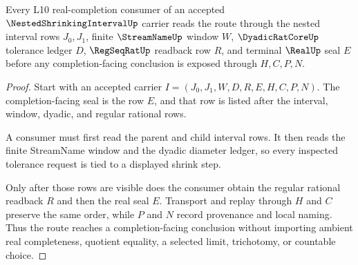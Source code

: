 \begin{theorem}
\label{thm:nested-shrinking-interval-real-completion-handoff}
Every L10 real-completion consumer of an accepted $\NestedShrinkingIntervalUp$ carrier reads the route through the nested interval rows $J_0,J_1$, finite $\StreamNameUp$ window $W$, $\DyadicRatCoreUp$ tolerance ledger $D$, $\RegSeqRatUp$ readback row $R$, and terminal $\RealUp$ seal $E$ before any completion-facing conclusion is exposed through $H,C,P,N$.
\end{theorem}
\begin{proof}
Start with an accepted carrier $I=(J_0,J_1,W,D,R,E,H,C,P,N)$. The completion-facing seal is the row $E$, and that row is listed after the interval, window, dyadic, and regular rational rows.

A consumer must first read the parent and child interval rows. It then reads the finite StreamName window and the dyadic diameter ledger, so every inspected tolerance request is tied to a displayed shrink step.

Only after those rows are visible does the consumer obtain the regular rational readback $R$ and then the real seal $E$. Transport and replay through $H$ and $C$ preserve the same order, while $P$ and $N$ record provenance and local naming. Thus the route reaches a completion-facing conclusion without importing ambient real completeness, quotient equality, a selected limit, trichotomy, or countable choice.
\end{proof}


\begin{closurestatus}{\NestedShrinkingIntervalUp}
  \theoryclosure{\seedClosure}
  \formalstatus{\theoremCheckedV}
\end{closurestatus}
